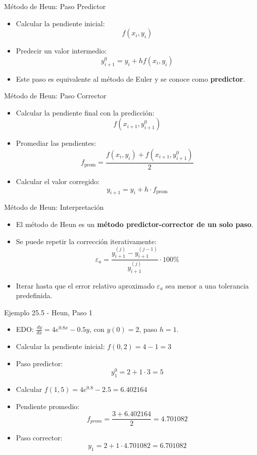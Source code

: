 \documentclass[main.tex]{subfiles}
\begin{document}
\begin{frame}{\small M\'etodo de Heun: Paso Predictor}
\begin{itemize}
  \item Calcular la pendiente inicial:
  \[
    f(x_i, y_i)
  \]
  \item Predecir un valor intermedio:
  \[
    y^0_{i+1} = y_i + h f(x_i, y_i)
  \]
  \item Este paso es equivalente al m\'etodo de Euler y se conoce como \textbf{predictor}.
\end{itemize}
\end{frame}

\begin{frame}{\small M\'etodo de Heun: Paso Corrector}
\begin{itemize}
  \item Calcular la pendiente final con la predicci\'on:
  \[
    f(x_{i+1}, y^0_{i+1})
  \]
  \item Promediar las pendientes:
  \[
    f_{\text{prom}} = \frac{f(x_i, y_i) + f(x_{i+1}, y^0_{i+1})}{2}
  \]
  \item Calcular el valor corregido:
  \[
    y_{i+1} = y_i + h \cdot f_{\text{prom}}
  \]
\end{itemize}
\end{frame}

\begin{frame}{\small M\'etodo de Heun: Interpretaci\'on}
\begin{itemize}
  \item El m\'etodo de Heun es un \textbf{m\'etodo predictor-corrector de un solo paso}.
  \item Se puede repetir la correcci\'on iterativamente:
  \[
    \varepsilon_a = \frac{y^{(j)}_{i+1} - y^{(j-1)}_{i+1}}{y^{(j)}_{i+1}} \cdot 100\%
  \]
  \item Iterar hasta que el error relativo aproximado \( \varepsilon_a \) sea menor a una tolerancia predefinida.
\end{itemize}
\end{frame}

\begin{frame}{\small Ejemplo 25.5 - Heun, Paso 1}
\begin{itemize}
  \item EDO: \( \frac{dy}{dx} = 4e^{0.8x} - 0.5y \), con \( y(0) = 2 \), paso $h=1$.
  \item Calcular la pendiente inicial: \( f(0, 2) = 4 - 1 = 3 \)
  \item Paso predictor:
  \[
    y^0_1 = 2 + 1 \cdot 3 = 5
  \]
  \item Calcular \( f(1, 5) = 4e^{0.8} - 2.5 = 6.402164 \)
  \item Pendiente promedio:
  \[
    f_{prom} = \frac{3 + 6.402164}{2} = 4.701082
  \]
  \item Paso corrector:
  \[
    y_1 = 2 + 1 \cdot 4.701082 = 6.701082
  \]
\end{itemize}
\end{frame}
\end{document}
